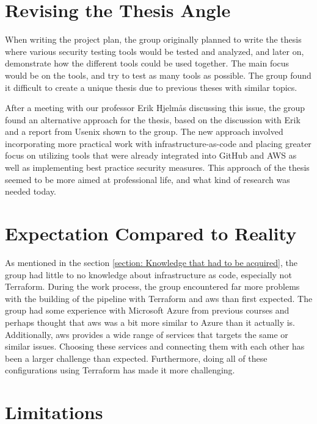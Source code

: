 \section{Revising the Thesis Angle}
When writing the project plan, the group originally planned to write the thesis where various security testing tools would be tested and analyzed, and later on, demonstrate how the different tools could be used together. The main focus would be on the tools, and try to test as many tools as possible. The group found it difficult to create a unique thesis due to previous theses with similar topics. 

After a meeting with our professor Erik Hjelmås discussing this issue, the group found an alternative approach for the thesis, based on the discussion with Erik and a report from Usenix \cite{usenixreport} shown to the group. The new approach involved incorporating more practical work with infrastructure-as-code and placing greater focus on utilizing tools that were already integrated into GitHub and AWS as well as implementing best practice security measures. This approach of the thesis seemed to be more aimed at professional life, and what kind of research was needed today.  


\section{Expectation Compared to Reality}
As mentioned in the section \ref{section: Knowledge that had to be acquired}, the group had little to no knowledge about \gls{infrastructure as code}, especially not Terraform. During the work process, the group encountered far more problems with the building of the pipeline with Terraform and \acrshort{aws} than first expected. The group had some experience with Microsoft Azure from previous courses and perhaps thought that \acrshort{aws} was a bit more similar to Azure than it actually is. Additionally, \acrshort{aws} provides a wide range of services that targets the same or similar issues. Choosing these services and connecting them with each other has been a larger challenge than expected. Furthermore, doing all of these configurations using Terraform has made it more challenging.


\section{Limitations}
